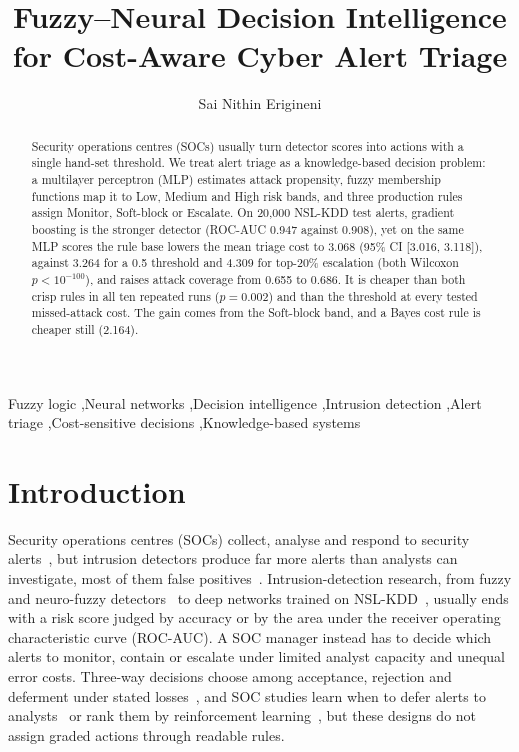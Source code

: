 \documentclass[preprint,12pt]{elsarticle}
\begin{document}
\begin{frontmatter}

\title{Fuzzy--Neural Decision Intelligence for Cost-Aware Cyber Alert Triage}

\author[mu]{Sai Nithin Erigineni}
\address[mu]{DBA, Midwest University, 851 Parr Rd, Wentzville, MO 63385, United States}

\begin{abstract}
Security operations centres (SOCs) usually turn detector scores into actions with a single hand-set threshold. We treat alert triage as a knowledge-based decision problem: a multilayer perceptron (MLP) estimates attack propensity, fuzzy membership functions map it to Low, Medium and High risk bands, and three production rules assign Monitor, Soft-block or Escalate. On 20,000 NSL-KDD test alerts, gradient boosting is the stronger detector (ROC-AUC 0.947 against 0.908), yet on the same MLP scores the rule base lowers the mean triage cost to 3.068 (95\% CI [3.016, 3.118]), against 3.264 for a 0.5 threshold and 4.309 for top-20\% escalation (both Wilcoxon $p<10^{-100}$), and raises attack coverage from 0.655 to 0.686. It is cheaper than both crisp rules in all ten repeated runs ($p=0.002$) and than the threshold at every tested missed-attack cost. The gain comes from the Soft-block band, and a Bayes cost rule is cheaper still (2.164).
\end{abstract}

\begin{keyword}
Fuzzy logic \sep Neural networks \sep Decision intelligence \sep Intrusion detection \sep Alert triage \sep Cost-sensitive decisions \sep Knowledge-based systems
\end{keyword}
\end{frontmatter}
\enlargethispage{\baselineskip}

\section{Introduction}
\label{sec:intro}
Security operations centres (SOCs) collect, analyse and respond to security alerts~\cite{vielberth2020}, but intrusion detectors produce far more alerts than analysts can investigate, most of them false positives~\cite{albasheer2022}. Intrusion-detection research, from fuzzy and neuro-fuzzy detectors~\cite{toosi2007,hamamoto2018} to deep networks trained on NSL-KDD~\cite{vinayakumar2019,su2020}, usually ends with a risk score judged by accuracy or by the area under the receiver operating characteristic curve (ROC-AUC). A SOC manager instead has to decide which alerts to monitor, contain or escalate under limited analyst capacity and unequal error costs. Three-way decisions choose among acceptance, rejection and deferment under stated losses~\cite{yao2010}, and SOC studies learn when to defer alerts to analysts~\cite{jalalvand2027} or rank them by reinforcement learning~\cite{wang2024alertpro}, but these designs do not assign graded actions through readable rules.
\end{document}
